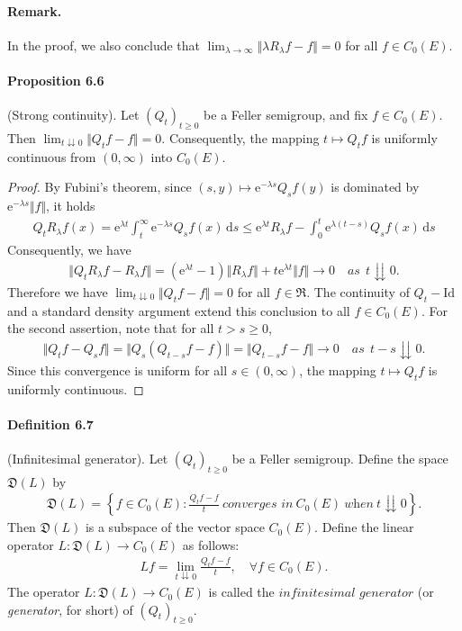 \documentclass{article}
\numberwithin{equation}{section}
\newcommand{\e}{\mathrm{e}}
\renewcommand{\d}{\mathrm{d}}
\theoremstyle{plain}
\theoremstyle{definition}
\begin{document}
\paragraph{Remark.} In the proof, we also conclude that $\lim_{\lambda\to\infty}\Vert\lambda R_\lambda f-f\Vert =0$ for all $f\in C_0(E)$.

\paragraph{Proposition 6.6} (Strong continuity). Let $(Q_t)_{t\geq 0}$ be a Feller semigroup, and fix $f\in C_0(E)$. Then $\lim_{t\downdownarrows 0}\Vert Q_t f-f\Vert = 0$. Consequently, the mapping $t\mapsto Q_t f$ is uniformly continuous from $(0,\infty)$ into $C_0(E)$.
\begin{proof}
By Fubini's theorem, since $(s,y)\mapsto\e^{-\lambda s}Q_sf(y)$ is dominated by $\e^{-\lambda s}\Vert f\Vert$, it holds
\begin{align*}
	Q_tR_\lambda f(x) = \e^{\lambda t}\int_t^\infty \e^{-\lambda s}Q_sf(x)\,\d s \leq\e^{\lambda t}R_\lambda f -\int_0^t\e^{\lambda(t-s)}Q_sf(x)\,\d s
\end{align*}
Consequently, we have
\begin{align*}
	\Vert Q_tR_\lambda f-R_\lambda f\Vert = \left(\e^{\lambda t}-1\right)\Vert R_\lambda f\Vert + t\e^{\lambda t}\Vert f\Vert\to 0\quad \textit{as}\ \ t\downdownarrows 0.
\end{align*}
Therefore we have $\lim_{t\downdownarrows 0}\Vert Q_t f-f\Vert = 0$ for all $f\in\mathfrak{R}$. The continuity of $Q_t-\mathrm{Id}$ and a standard density argument extend this conclusion to all $f\in C_0(E)$. For the second assertion, note that for all $t>s\geq 0$,
\begin{align*}
	\Vert Q_tf-Q_sf\Vert = \Vert Q_s(Q_{t-s}f - f)\Vert = \Vert Q_{t-s}f - f\Vert \to 0\quad\textit{as}\ \ t-s\downdownarrows 0.
\end{align*}
Since this convergence is uniform for all $s\in(0,\infty)$, the mapping $t\mapsto Q_tf$ is uniformly continuous.
\end{proof}

\paragraph{Definition 6.7\label{def:6.7}} (Infinitesimal generator). Let $(Q_t)_{t\geq 0}$ be a Feller semigroup. Define the space $\mathfrak{D}(L)$ by
\begin{align*}
	\mathfrak{D}(L)=\left\{f\in C_0(E):\frac{Q_t f-f}{t}\ \textit{converges in}\ C_0(E)\ \textit{when}\ t\downdownarrows 0\right\}.
\end{align*}
Then $\mathfrak{D}(L)$ is a subspace of the vector space $C_0(E)$. Define the linear operator $L:\mathfrak{D}(L)\to C_0(E)$ as follows:
\begin{align*}
	Lf=\lim_{t\downdownarrows 0}\frac{Q_t f-f}{t},\quad\forall f\in C_0(E).
\end{align*}
The operator $L:\mathfrak{D}(L)\to C_0(E)$ is called the $\textit{infinitesimal generator}$ (or \textit{generator}, for short) of $(Q_t)_{t\geq 0}$.
\end{document}
